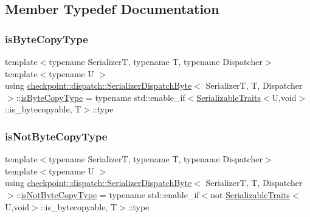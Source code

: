 \subsection{Member Typedef Documentation}
\mbox{\label{structcheckpoint_1_1dispatch_1_1_serializer_dispatch_byte_a6de610e1888790d04dbde87b243d7c7f}} 
\subsubsection{\texorpdfstring{is\+Byte\+Copy\+Type}{isByteCopyType}}
{\footnotesize\ttfamily template$<$typename SerializerT, typename T, typename Dispatcher$>$ \\
template$<$typename U $>$ \\
using \hyperlink{structcheckpoint_1_1dispatch_1_1_serializer_dispatch_byte}{checkpoint\+::dispatch\+::\+Serializer\+Dispatch\+Byte}$<$ SerializerT, T, Dispatcher $>$\+::\hyperlink{structcheckpoint_1_1dispatch_1_1_serializer_dispatch_byte_a6de610e1888790d04dbde87b243d7c7f}{is\+Byte\+Copy\+Type} =  typename std\+::enable\+\_\+if$<$\hyperlink{structcheckpoint_1_1_serializable_traits}{Serializable\+Traits}$<$U,void$>$\+::is\+\_\+bytecopyable, T$>$\+::type}

\mbox{\label{structcheckpoint_1_1dispatch_1_1_serializer_dispatch_byte_ab1c9cd927c357c30c095356c44252ccd}} 
\subsubsection{\texorpdfstring{is\+Not\+Byte\+Copy\+Type}{isNotByteCopyType}}
{\footnotesize\ttfamily template$<$typename SerializerT, typename T, typename Dispatcher$>$ \\
template$<$typename U $>$ \\
using \hyperlink{structcheckpoint_1_1dispatch_1_1_serializer_dispatch_byte}{checkpoint\+::dispatch\+::\+Serializer\+Dispatch\+Byte}$<$ SerializerT, T, Dispatcher $>$\+::\hyperlink{structcheckpoint_1_1dispatch_1_1_serializer_dispatch_byte_ab1c9cd927c357c30c095356c44252ccd}{is\+Not\+Byte\+Copy\+Type} =  typename std\+::enable\+\_\+if$<$not \hyperlink{structcheckpoint_1_1_serializable_traits}{Serializable\+Traits}$<$U,void$>$\+::is\+\_\+bytecopyable, T$>$\+::type}



